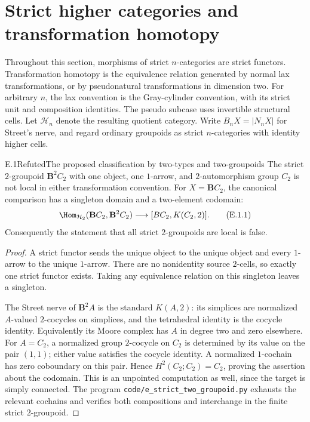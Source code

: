 \section{Strict higher categories and transformation homotopy}

Throughout this section, morphisms of strict $n$-categories are strict functors. Transformation homotopy is the equivalence relation generated by normal lax transformations, or by pseudonatural transformations in dimension two. For arbitrary $n$, the lax convention is the Gray-cylinder convention, with its strict unit and composition identities. The pseudo subcase uses invertible structural cells. Let $\mathcal H_n$ denote the resulting quotient category. Write $B_nX=|N_nX|$ for Street's nerve, and regard ordinary groupoids as strict $n$-categories with identity higher cells.

\begin{claim}{E.1}{Refuted}{The proposed classification by two-types and two-groupoids}
The strict $2$-groupoid $\mathbf B^2C_2$ with one object, one $1$-arrow, and $2$-automorphism group $C_2$ is not local in either transformation convention. For $X=\mathbf BC_2$, the canonical comparison has a singleton domain and a two-element codomain:
\[
 \Hom_{\mathcal H_2}(\mathbf BC_2,\mathbf B^2C_2)
 \longrightarrow [BC_2,K(C_2,2)]. \tag{E.1.1}
\]
Consequently the statement that all strict $2$-groupoids are local is false.
\end{claim}
\begin{proof}
A strict functor sends the unique object to the unique object and every $1$-arrow to the unique $1$-arrow. There are no nonidentity source $2$-cells, so exactly one strict functor exists. Taking any equivalence relation on this singleton leaves a singleton.

The Street nerve of $\mathbf B^2A$ is the standard $K(A,2)$: its simplices are normalized $A$-valued $2$-cocycles on simplices, and the tetrahedral identity is the cocycle identity. Equivalently its Moore complex has $A$ in degree two and zero elsewhere. For $A=C_2$, a normalized group $2$-cocycle on $C_2$ is determined by its value on the pair $(1,1)$; either value satisfies the cocycle identity. A normalized $1$-cochain has zero coboundary on this pair. Hence $H^2(C_2;C_2)=C_2$, proving the assertion about the codomain. This is an unpointed computation as well, since the target is simply connected. The program \texttt{code/e\_strict\_two\_groupoid.py} exhausts the relevant cochains and verifies both compositions and interchange in the finite strict $2$-groupoid.
\end{proof}


